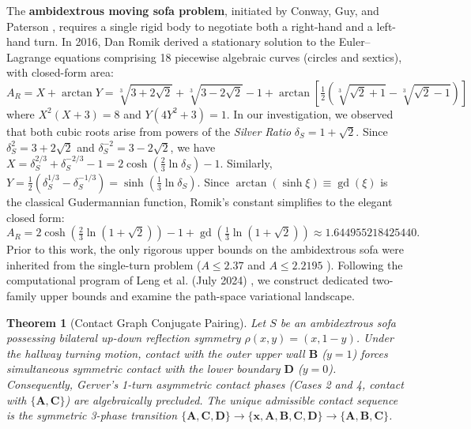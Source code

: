 \documentclass[11pt]{article}
\newtheorem{theorem}{Theorem}
\begin{document}
The \textbf{ambidextrous moving sofa problem}, initiated by Conway, Guy, and Paterson \cite{gibbs}, requires a single rigid body to negotiate both a right-hand and a left-hand turn. In 2016, Dan Romik \cite{romik} derived a stationary solution to the Euler--Lagrange equations comprising 18 piecewise algebraic curves (circles and sextics), with closed-form area:
\begin{equation}
A_R = X + \arctan Y = \sqrt[3]{3+2\sqrt{2}} + \sqrt[3]{3-2\sqrt{2}} - 1 + \arctan\left[\tfrac{1}{2}\left(\sqrt[3]{\sqrt{2}+1} - \sqrt[3]{\sqrt{2}-1}\right)\right]
\end{equation}
where $X^2(X+3) = 8$ and $Y(4Y^2+3) = 1$. In our investigation, we observed that both cubic roots arise from powers of the \emph{Silver Ratio} $\delta_S = 1 + \sqrt{2}$. Since $\delta_S^2 = 3 + 2\sqrt{2}$ and $\delta_S^{-2} = 3 - 2\sqrt{2}$, we have $X = \delta_S^{2/3} + \delta_S^{-2/3} - 1 = 2\cosh(\tfrac{2}{3}\ln \delta_S) - 1$. Similarly, $Y = \tfrac{1}{2}(\delta_S^{1/3} - \delta_S^{-1/3}) = \sinh(\tfrac{1}{3}\ln \delta_S)$. Since $\arctan(\sinh \xi) \equiv \operatorname{gd}(\xi)$ is the classical Gudermannian function, Romik's constant simplifies to the elegant closed form:
\begin{equation}
A_R = 2\cosh\left(\tfrac{2}{3}\ln(1+\sqrt{2})\right) - 1 + \operatorname{gd}\left(\tfrac{1}{3}\ln(1+\sqrt{2})\right) \approx 1.644955218425440.
\end{equation}
Prior to this work, the only rigorous upper bounds on the ambidextrous sofa were inherited from the single-turn problem ($A \le 2.37$ \cite{kallusromik} and $A \le 2.2195$ \cite{baek}). Following the computational program of Leng et al. (July 2024) \cite{leng}, we construct dedicated two-family upper bounds and examine the path-space variational landscape.

\begin{theorem}[Contact Graph Conjugate Pairing]
Let $S$ be an ambidextrous sofa possessing bilateral up-down reflection symmetry $\rho(x, y) = (x, 1-y)$. Under the hallway turning motion, contact with the outer upper wall $\mathbf{B}$ ($y=1$) forces simultaneous symmetric contact with the lower boundary $\mathbf{D}$ ($y=0$). Consequently, Gerver's 1-turn asymmetric contact phases (Cases 2 and 4, contact with $\{\mathbf{A}, \mathbf{C}\}$) are algebraically precluded. The unique admissible contact sequence is the symmetric 3-phase transition $\{\mathbf{A},\mathbf{C},\mathbf{D}\} \to \{\mathbf{x},\mathbf{A},\mathbf{B},\mathbf{C},\mathbf{D}\} \to \{\mathbf{A},\mathbf{B},\mathbf{C}\}$.
\end{theorem}
\end{document}

